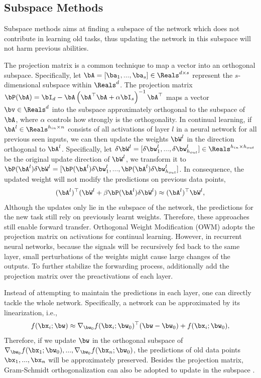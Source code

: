 \subsection{Subspace Methods}

Subspace methods aims at finding a subspace of the network which does not contribute in learning old tasks, thus updating the network in this subspace will not harm previous abilities.

The projection matrix is a common technique to map a vector into an orthogonal subspace. Specifically, let $\bA = [\ba_1, ..., \ba_s] \in \Reals^{d \times s}$ represent the $s$-dimensional subspace within $\Reals^d$. The projection matrix $\bP(\bA) = \bI_d - \bA \left(\bA^{\top}\bA + \alpha \bI_s\right)^{-1} \bA^{\top}$ maps a vector $\bv \in \Reals^{d}$ into the subspace approximately orthogonal to the subspace of $\bA$, where $\alpha$ controls how strongly is the orthogonality. In continual learning, if $\bA^l \in \Reals^{h_{in} \times n}$ consists of all activations of layer $l$ in a neural network for all previous seen inputs, we can then update the weights $\bW^l$ in the direction orthogonal to $\bA^l$. Specifically, let $\delta \bW^l = [\delta \bw_1^l, ..., \delta \bw_{h_{out}}^l] \in \Reals^{ h_{in} \times h_{out}}$ be the original update direction of $\bW^l$, we transform it to $\bP(\bA^l) \delta \bW^l = [\bP(\bA^l) \delta \bw_1^l, ..., \bP(\bA^l) \delta \bw_{h_{out}}^l] $. In consequence, the updated weight will not modify the predictions on previous data points,
\begin{align}
    (\bA^l)^{\top} (\bW^l + \beta \bP(\bA^l) \delta \bW^l) \approx (\bA^l)^{\top} \bW^l,
\end{align}
Although the updates only lie in the subspace of the network, the predictions for the new task still rely on previously learnt weights. Therefore, these approaches still enable forward transfer. Orthogonal Weight Modification (OWM) \citep{zeng2019continual} adopts the projection matrix on activations for continual learning. However, in recurrent neural networks, because the signals will be recursively fed back to the same layer, small perturbations of the weights might cause large changes of the outputs. To further stabilize the forwarding process, \citet{duncker2020organizing} additionally add the projection matrix over the preactivations of each layer.


Instead of attempting to maintain the predictions in each layer, one can directly tackle the whole network. Specifically, a network can be approximated by its linearization, i.e., 
\begin{align}
    f(\bx_i; \bw) \approx \nabla_{\bw_0} f(\bx_i; \bw_0)^{\top}(\bw - \bw_0) + f(\bx_i; \bw_0) ,
\end{align}
Therefore, if we update $\bw$ in the orthogonal subspace of $\nabla_{\bw_0} f(\bx_1; \bw_0), ..., \nabla_{\bw_0} f(\bx_n; \bw_0)$, the predictions of old data points $\bx_1, ..., \bx_n$ will be approximately preserved. Besides the projection matrix, Gram-Schmidt orthogonalization can also be adopted to update in the subspace \citep{farajtabar2020orthogonal}.

